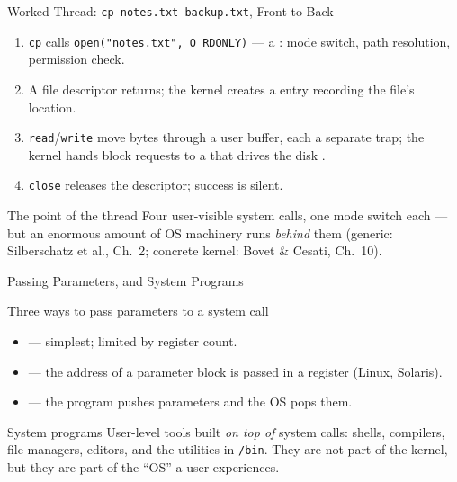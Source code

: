 \documentclass[aspectratio=169]{beamer}
\begin{document}
\begin{frame}{Worked Thread: \texttt{cp notes.txt backup.txt}, Front to Back}
  \begin{enumerate}
    \item \texttt{cp} calls \texttt{open("notes.txt", O\_RDONLY)} --- a
      : mode switch, path resolution, permission check.
    \item A file descriptor returns; the kernel creates a  entry recording the file's location.
    \item \texttt{read}/\texttt{write} move bytes through a user buffer, each a
      separate trap; the kernel hands block requests to a 
      that drives the disk .
    \item \texttt{close} releases the descriptor; success is silent.
  \end{enumerate}
  \vspace{0.1cm}
  \begin{alertblock}{The point of the thread}
    Four user-visible system calls, one mode switch each --- but an enormous
    amount of OS machinery runs \emph{behind} them (generic: Silberschatz et al.,
    Ch.~2; concrete kernel: Bovet \& Cesati, Ch.~10).
  \end{alertblock}
\end{frame}

\begin{frame}{Passing Parameters, and System Programs}
  \begin{block}{Three ways to pass parameters to a system call}
    \begin{itemize}
      \item {} --- simplest; limited by register count.
      \item {} --- the address of a parameter block is passed
        in a register (Linux, Solaris).
      \item {} --- the program pushes parameters and the OS pops them.
    \end{itemize}
  \end{block}
  \begin{block}{System programs}
    User-level tools built \emph{on top of} system calls: shells, compilers,
    file managers, editors, and the utilities in \texttt{/bin}. They are not
    part of the kernel, but they are part of the ``OS'' a user experiences.
  \end{block}
\end{frame}
\end{document}
